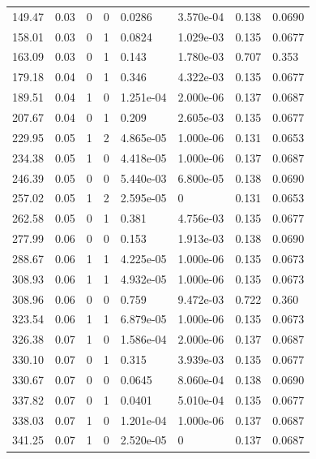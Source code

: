 \documentclass[preview]{standalone}
\begin{document}
{{\begin{tabular}{L{1.2cm}C{1.2cm} C{0.3cm}C{0.5cm} C{1.4cm}C{1.4cm} C{1.4cm}C{1.4cm}}
  149.47  &  0.03  & 0     &  0 &  0.0286  & 3.570e-04  & 0.138 &  0.0690   \\ 
  158.01  &  0.03  & 0     &  1 &  0.0824  & 1.029e-03  & 0.135 &  0.0677   \\ 
  163.09  &  0.03  & 0     &  1 &  0.143  & 1.780e-03  & 0.707 &  0.353   \\ 
  179.18  &  0.04  & 0     &  1 &  0.346  & 4.322e-03  & 0.135 &  0.0677   \\ 
  189.51  &  0.04  & 1     &  0 &  1.251e-04  & 2.000e-06  & 0.137 &  0.0687   \\ 
  207.67  &  0.04  & 0     &  1 &  0.209  & 2.605e-03  & 0.135 &  0.0677   \\ 
  229.95  &  0.05  & 1     &  2 &  4.865e-05  & 1.000e-06  & 0.131 &  0.0653   \\ 
  234.38  &  0.05  & 1     &  0 &  4.418e-05  & 1.000e-06  & 0.137 &  0.0687   \\ 
  246.39  &  0.05  & 0     &  0 &  5.440e-03  & 6.800e-05  & 0.138 &  0.0690   \\ 
  257.02  &  0.05  & 1     &  2 &  2.595e-05  & 0  & 0.131 &  0.0653   \\ 
  262.58  &  0.05  & 0     &  1 &  0.381  & 4.756e-03  & 0.135 &  0.0677   \\ 
  277.99  &  0.06  & 0     &  0 &  0.153  & 1.913e-03  & 0.138 &  0.0690   \\ 
  288.67  &  0.06  & 1     &  1 &  4.225e-05  & 1.000e-06  & 0.135 &  0.0673   \\ 
  308.93  &  0.06  & 1     &  1 &  4.932e-05  & 1.000e-06  & 0.135 &  0.0673   \\ 
  308.96  &  0.06  & 0     &  0 &  0.759  & 9.472e-03  & 0.722 &  0.360   \\ 
  323.54  &  0.06  & 1     &  1 &  6.879e-05  & 1.000e-06  & 0.135 &  0.0673   \\ 
  326.38  &  0.07  & 1     &  0 &  1.586e-04  & 2.000e-06  & 0.137 &  0.0687   \\ 
  330.10  &  0.07  & 0     &  1 &  0.315  & 3.939e-03  & 0.135 &  0.0677   \\ 
  330.67  &  0.07  & 0     &  0 &  0.0645  & 8.060e-04  & 0.138 &  0.0690   \\ 
  337.82  &  0.07  & 0     &  1 &  0.0401  & 5.010e-04  & 0.135 &  0.0677   \\ 
  338.03  &  0.07  & 1     &  0 &  1.201e-04  & 1.000e-06  & 0.137 &  0.0687   \\ 
  341.25  &  0.07  & 1     &  0 &  2.520e-05  & 0  & 0.137 &  0.0687   \\ 

\end{tabular}}}
\end{document}
